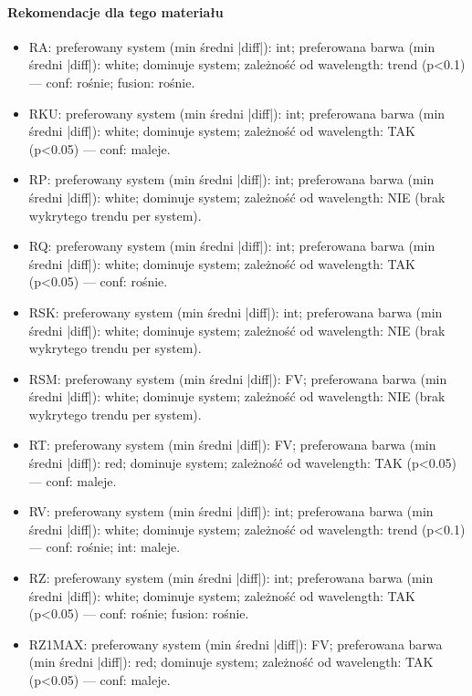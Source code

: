 \documentclass[
  10pt,
]{article}
\begin{document}
\paragraph{Rekomendacje dla tego materiału}
\begin{itemize}
\item RA: preferowany system (min średni |diff|): int; preferowana barwa (min średni |diff|): white; dominuje system; zależność od wavelength: trend (p<0.1) — conf: rośnie; fusion: rośnie.
\item RKU: preferowany system (min średni |diff|): int; preferowana barwa (min średni |diff|): white; dominuje system; zależność od wavelength: TAK (p<0.05) — conf: maleje.
\item RP: preferowany system (min średni |diff|): int; preferowana barwa (min średni |diff|): white; dominuje system; zależność od wavelength: NIE (brak wykrytego trendu per system).
\item RQ: preferowany system (min średni |diff|): int; preferowana barwa (min średni |diff|): white; dominuje system; zależność od wavelength: TAK (p<0.05) — conf: rośnie.
\item RSK: preferowany system (min średni |diff|): int; preferowana barwa (min średni |diff|): white; dominuje system; zależność od wavelength: NIE (brak wykrytego trendu per system).
\item RSM: preferowany system (min średni |diff|): FV; preferowana barwa (min średni |diff|): white; dominuje system; zależność od wavelength: NIE (brak wykrytego trendu per system).
\item RT: preferowany system (min średni |diff|): FV; preferowana barwa (min średni |diff|): red; dominuje system; zależność od wavelength: TAK (p<0.05) — conf: maleje.
\item RV: preferowany system (min średni |diff|): int; preferowana barwa (min średni |diff|): white; dominuje system; zależność od wavelength: trend (p<0.1) — conf: rośnie; int: maleje.
\item RZ: preferowany system (min średni |diff|): int; preferowana barwa (min średni |diff|): white; dominuje system; zależność od wavelength: TAK (p<0.05) — conf: rośnie; fusion: rośnie.
\item RZ1MAX: preferowany system (min średni |diff|): FV; preferowana barwa (min średni |diff|): red; dominuje system; zależność od wavelength: TAK (p<0.05) — conf: maleje.
\end{itemize}
\end{document}
